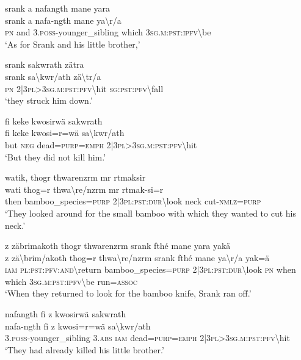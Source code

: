 \ea\label{ex:4:a1695}
srank a nafangth mane yara\\
\gll srank	a	nafa-ngth	mane	ya{\textbackslash}r/a\\
     \textsc{pn}	and	3.\textsc{poss}-younger\_sibling	which	3\textsc{sg}.\textsc{m}:\textsc{pst}:\textsc{ipfv}{\textbackslash}be\\
\glt `As for Srank and his little brother,'
\z

\ea\label{ex:4:a1697}
srank sakwrath zätra\\
\gll srank	sa{\textbackslash}kwr/ath	zä{\textbackslash}tr/a\\
     \textsc{pn}	2|3\textsc{pl}>3\textsc{sg}.\textsc{m}:\textsc{pst}:\textsc{pfv}{\textbackslash}hit	\textsc{sg}:\textsc{pst}:\textsc{pfv}{\textbackslash}fall\\
\glt `they struck him down.'
\z

\ea\label{ex:4:a1698}
fi keke kwosirwä sakwrath\\
\gll fi	keke	kwosi=r=wä	sa{\textbackslash}kwr/ath\\
     but	\textsc{neg}	dead=\textsc{purp}=\textsc{emph}	2|3\textsc{pl}>3\textsc{sg}.\textsc{m}:\textsc{pst}:\textsc{pfv}{\textbackslash}hit\\
\glt `But they did not kill him.'
\z

\ea\label{ex:4:a1699}
watik, thogr thwarenzrm mr rtmaksir\\
\gll wati	thog=r	thwa{\textbackslash}re/nzrm	mr	rtmak-si=r\\
     then	bamboo\_species=\textsc{purp}	2|3\textsc{pl}:\textsc{pst}:\textsc{dur}{\textbackslash}look	neck	cut-\textsc{nmlz}=\textsc{purp}\\
\glt `They looked around for the small bamboo with which they wanted to cut his neck.'
\z

\ea\label{ex:4:a1700}
z zäbrimakoth thogr thwarenzrm srank fthé mane yara yakä\\
\gll z	zä{\textbackslash}brim/akoth	thog=r	thwa{\textbackslash}re/nzrm	srank	fthé	mane	ya{\textbackslash}r/a	yak=ä\\
     \textsc{iam}	\textsc{pl}:\textsc{pst}:\textsc{pfv}:\textsc{and}{\textbackslash}return	bamboo\_species=\textsc{purp}	2|3\textsc{pl}:\textsc{pst}:\textsc{dur}{\textbackslash}look	\textsc{pn}	when	which	3\textsc{sg}.\textsc{m}:\textsc{pst}:\textsc{ipfv}{\textbackslash}be	run=\textsc{assoc}\\
\glt `When they returned to look for the bamboo knife, Srank ran off.'
\z

\ea\label{ex:4:a1702}
nafangth fi z kwosirwä sakwrath\\
\gll nafa-ngth	fi	z	kwosi=r=wä	sa{\textbackslash}kwr/ath\\
     3.\textsc{poss}-younger\_sibling	3.\textsc{abs}	\textsc{iam}	dead=\textsc{purp}=\textsc{emph}	2|3\textsc{pl}>3\textsc{sg}.\textsc{m}:\textsc{pst}:\textsc{pfv}{\textbackslash}hit\\
\glt `They had already killed his little brother.'
\z


